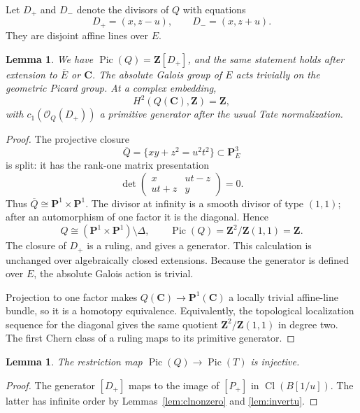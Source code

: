 \documentclass[11pt,a4paper]{article}
\newtheorem{lemma}[theorem]{Lemma}
\theoremstyle{remark}
\newcommand{\Z}{\mathbf Z}
\newcommand{\C}{\mathbf C}
\newcommand{\PP}{\mathbf P}
\newcommand{\OO}{\mathcal O}
\newcommand{\Pic}{\operatorname{Pic}}
\newcommand{\Cl}{\operatorname{Cl}}
\begin{document}
Let $D_+$ and $D_-$ denote the divisors of $Q$ with equations
\[
D_+=(x,z-u),\qquad D_-=(x,z+u).
\]
They are disjoint affine lines over $E$.

\begin{lemma}\label{lem:quadricpic}
We have $\Pic(Q)=\Z[D_+]$, and the same statement holds after extension to $\overline E$ or $\C$. The absolute Galois group of $E$ acts trivially on the geometric Picard group. At a complex embedding,
\[
H^2(Q(\C),\Z)=\Z,
\]
with $c_1(\OO_Q(D_+))$ a primitive generator after the usual Tate normalization.
\end{lemma}
\begin{proof}
The projective closure
\[
\overline Q=\{xy+z^2=u^2t^2\}\subset\PP^3_E
\]
is split: it has the rank-one matrix presentation
\[
\det\begin{pmatrix}x&ut-z\\ut+z&y\end{pmatrix}=0.
\]
Thus $\overline Q\cong\PP^1\times\PP^1$. The divisor at infinity is a smooth divisor of type $(1,1)$; after an automorphism of one factor it is the diagonal. Hence
\[
Q\cong (\PP^1\times\PP^1)\setminus\Delta,
\qquad
\Pic(Q)=\Z^2/\Z(1,1)=\Z.
\]
The closure of $D_+$ is a ruling, and gives a generator. This calculation is unchanged over algebraically closed extensions. Because the generator is defined over $E$, the absolute Galois action is trivial.

Projection to one factor makes $Q(\C)\to\PP^1(\C)$ a locally trivial affine-line bundle, so it is a homotopy equivalence. Equivalently, the topological localization sequence for the diagonal gives the same quotient $\Z^2/\Z(1,1)$ in degree two. The first Chern class of a ruling maps to its primitive generator.
\end{proof}

\begin{lemma}\label{lem:Picinject}
The restriction map $\Pic(Q)\to\Pic(T)$ is injective.
\end{lemma}
\begin{proof}
The generator $[D_+]$ maps to the image of $[P_+]$ in $\Cl(B[1/u])$. The latter has infinite order by Lemmas~\ref{lem:clnonzero} and \ref{lem:invertu}.
\end{proof}
\end{document}
